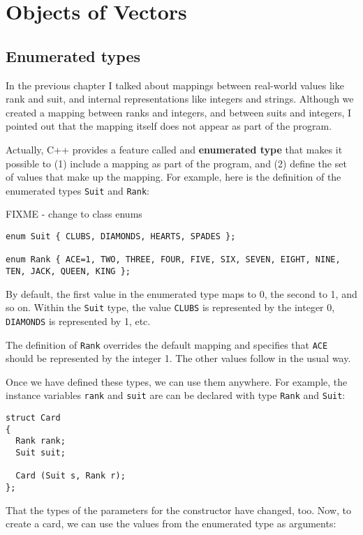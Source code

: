

\chapter{Objects of Vectors}

\section{Enumerated types}

In the previous chapter I talked about mappings between
real-world values like rank and suit, and internal representations
like integers and strings.  Although we created a mapping between
ranks and integers, and between suits and integers, I pointed
out that the mapping itself does not appear as part of the
program.

Actually, C++ provides a feature called and {\bf enumerated type}
that makes it possible to (1) include a mapping as part of the
program, and (2) define the set of values that make up the
mapping.  For example, here is the definition
of the enumerated types {\tt Suit} and {\tt Rank}:

FIXME - change to class enums
\begin{verbatim}
enum Suit { CLUBS, DIAMONDS, HEARTS, SPADES };

enum Rank { ACE=1, TWO, THREE, FOUR, FIVE, SIX, SEVEN, EIGHT, NINE,
TEN, JACK, QUEEN, KING };
\end{verbatim}
%
By default, the first value in the enumerated type maps to
0, the second to 1, and so on.  Within the {\tt Suit} type, the value
{\tt CLUBS} is represented by the integer 0, {\tt DIAMONDS} is
represented by 1, etc.

The definition of {\tt Rank} overrides the default mapping and
specifies that {\tt ACE} should be represented by the integer 1.
The other values follow in the usual way.

Once we have defined these types, we can use them anywhere.  For
example, the instance variables {\tt rank} and {\tt suit} are
can be declared with type {\tt Rank} and {\tt Suit}:

\begin{verbatim}
struct Card
{
  Rank rank;
  Suit suit;

  Card (Suit s, Rank r);
};
\end{verbatim}
%
That the types of the parameters for the constructor
have changed, too.  Now, to create a card, we can use the values from
the enumerated type as arguments:

